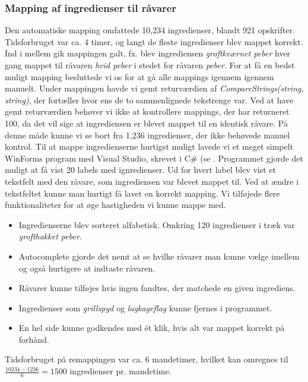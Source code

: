 \subsubsection{Mapping af ingredienser til råvarer}
Den automatiske mapping omfattede 10,234 ingredienser, blandt 921 opskrifter. Tidsforbruget var ca. 4 timer, og langt de fleste ingredienser blev mappet korrekt. Ind i mellem gik mappingen galt, fx. blev ingrediensen \textit{groftkværnet peber} hver gang mappet til råvaren \textit{hvid peber} i stedet for råvaren \textit{peber}. For at få en bedst muligt mapping besluttede vi os for at gå alle mappings igennem igennem manuelt. Under mappingen havde vi gemt returværdien af \textit{CompareStrings(string, string)}, der fortæller hvor ens de to sammenlignede tekstrenge var. Ved at have gemt returværdien behøver vi ikke at kontrollere mappings, der har returneret 100, da det vil sige at ingrediensen er blevet mappet til en identisk råvare. På denne måde kunne vi se bort fra 1,236 ingredienser, der ikke behøvede manuel kontrol.
Til at mappe ingredienserne hurtigst muligt lavede vi et meget simpelt WinForms program med Visual Studio, skrevet i C\# (se . Programmet gjorde det muligt at få vist 20 labels med ignredienser. Ud for hvert label blev vist et tekstfelt med den råvare, som ingrediensen var blevet mappet til. Ved at ændre i tekstfeltet kunne man hurtigt få lavet en korrekt mapping. Vi tilføjede flere funktionaliteter for at øge hastigheden vi kunne mappe med.
\begin{itemize}
\item Ingredienserne blev sorteret alfabetisk. Omkring 120 ingredienser i træk var \textit{grofthakket peber}.
\item Autocomplete gjorde det nemt at se hvilke råvarer man kunne vælge imellem og også hurtigere at indtaste råvaren.
\item Råvarer kunne tilføjes hvis ingen fandtes, der matchede en given ingrediens.
\item Ingredienser som \fx \textit{grillspyd} og \textit{lagkageflag} kunne fjernes i programmet.
\item En hel side kunne godkendes med ét klik, hvis alt var mappet korrekt på forhånd.
\end{itemize}

Tidsforbruget på remappingen var ca. 6 mandetimer, hvilket kan omregnes til $\frac{10234 - 1236}{6} = 1500$ ingredienser pr. mandetime.
